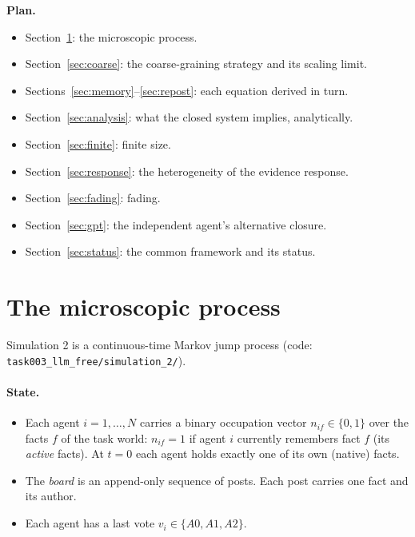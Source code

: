 \documentclass[10pt,a4paper]{article}
\theoremstyle{definition}
\begin{document}
\textbf{Plan.}
\begin{itemize}
\item Section~\ref{sec:micro}: the microscopic process.
\item Section~\ref{sec:coarse}: the coarse-graining strategy and its scaling limit.
\item Sections~\ref{sec:memory}--\ref{sec:repost}: each equation derived in turn.
\item Section~\ref{sec:analysis}: what the closed system implies, analytically.
\item Section~\ref{sec:finite}: finite size.
\item Section~\ref{sec:response}: the heterogeneity of the evidence response.
\item Section~\ref{sec:fading}: fading.
\item Section~\ref{sec:gpt}: the independent agent's alternative closure.
\item Section~\ref{sec:status}: the common framework and its status.
\end{itemize}

\section{The microscopic process}
\label{sec:micro}
Simulation 2 is a continuous-time Markov jump process (code: \nolinkurl{task003_llm_free/simulation_2/}).

\paragraph{State.}
\begin{itemize}
\item Each agent $i=1,\dots,N$ carries a binary occupation vector $n_{if}\in\{0,1\}$ over the facts $f$ of the task
  world: $n_{if}=1$ if agent $i$ currently remembers fact $f$ (its \emph{active} facts). At $t=0$ each agent holds
  exactly one of its own (native) facts.
\item The \emph{board} is an append-only sequence of posts. Each post carries one fact and its author.
\item Each agent has a last vote $v_i\in\{A0,A1,A2\}$.
\end{itemize}
\end{document}
